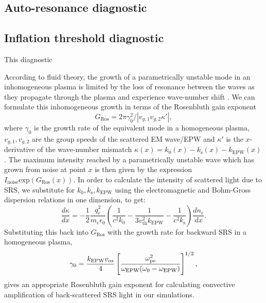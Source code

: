 \subsection{Auto-resonance diagnostic}

\subsection{Inflation threshold diagnostic}\label{diag:threshold}

This diagnostic 

According to fluid theory, the growth of a parametrically unstable mode in an inhomogeneous plasma is limited by the loss of resonance between the waves as they propagate through the plasma and experience wave-number shift \cite{Rosenbluth1972}. We can formulate this inhomogeneous growth in terms of the Rosenbluth gain exponent\cite{Rosenbluth1972}
\begin{equation}\label{eqn:GRos}
    G_\mathrm{Ros} = 2\pi\gamma_0^2/|v_{g,1}v_{g,2}\kappa'|,
\end{equation}
where $\gamma_0$ is the growth rate of the equivalent mode in a homogeneous plasma, $v_{g,1}, v_{g,2}$ are the group speeds of the scattered EM wave/EPW and $\kappa'$ is the $x$-derivative of the wave-number mismatch $\kappa(x) = k_0(x) -k_\mathrm{s}(x) -k_\mathrm{EPW}(x)$. The maximum intensity reached by a parametrically unstable wave which has grown from noise at point $x$ is then given by the expression $I_\mathrm{noise}\mathrm{exp}(G_\mathrm{Ros}(x))$. In order to calculate the intensity of scattered light due to SRS, we substitute for $k_0,k_\mathrm{s},k_\mathrm{EPW}$ using the electromagnetic and Bohm-Gross dispersion relations in one dimension, to get:
\begin{equation}\label{eqn:kappaPrime}
    \frac{d\kappa}{dx}= -\frac{1}{2}\frac{q_e^2}{m_e\epsilon_0}
    \left(\frac{1}{c^2k_0}-\frac{1}{3v_\mathrm{th}^2k_\mathrm{EPW}}-\frac{1}{c^2k_\mathrm{s}}\right)\frac{dn_e}{dx}.
\end{equation}
Substituting this back into $G_\mathrm{Ros}$ with the growth rate for backward SRS in a homogeneous plasma\cite{kruer2003},
\begin{equation}\label{eqn:gamma0}
    \centering
    \gamma_0 = \frac{k_\mathrm{EPW}v_{os}}{4}\left[\frac{\omega_{\mathrm{pe}}^2}{\omega_\mathrm{EPW}(\omega_0-\omega_\mathrm{EPW})}\right]^{1/2},
\end{equation}
gives an appropriate Rosenbluth gain exponent for calculating convective amplification of
back-scattered SRS light in our simulations.



